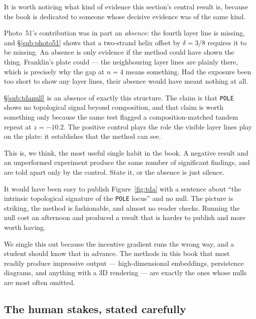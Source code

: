 \begin{remark}\label{rem:franklin-again}
It is worth noticing what kind of evidence this section's central result is,
because the book is dedicated to someone whose decisive evidence was of the same
kind.

Photo~51's contribution was in part an \emph{absence}: the fourth layer line is
missing, and \S\ref{sub:photo51} shows that a two-strand helix offset by
$\delta = 3/8$ requires it to be missing. An absence is only evidence if the
method could have shown the thing. Franklin's plate could --- the neighbouring
layer lines are plainly there, which is precisely why the gap at $n = 4$ means
something. Had the exposure been too short to show any layer lines, their absence
would have meant nothing at all.

\S\ref{sub:tdanull} is an absence of exactly this structure. The claim is that
\texttt{POLE} shows no topological signal beyond composition, and that claim is
worth something only because the same test flagged a composition-matched tandem
repeat at $z = -10.2$. The positive control plays the role the visible layer
lines play on the plate: it establishes that the method can see.

This is, we think, the most useful single habit in the book. A negative result
and an unperformed experiment produce the same number of significant findings,
and are told apart only by the control. State it, or the absence is just silence.
\end{remark}

\begin{remark}
It would have been easy to publish Figure~\ref{fig:tda} with a sentence about
``the intrinsic topological signature of the \texttt{POLE} locus'' and no null.
The picture is striking, the method is fashionable, and almost no reader checks.
Running the null cost an afternoon and produced a result that is harder to
publish and more worth having.

We single this out because the incentive gradient runs the wrong way, and a
student should know that in advance. The methods in this book that most readily
produce impressive output --- high-dimensional embeddings, persistence diagrams,
and anything with a $3$D rendering --- are exactly the ones whose nulls are most
often omitted.
\end{remark}

\subsection{The human stakes, stated carefully}

